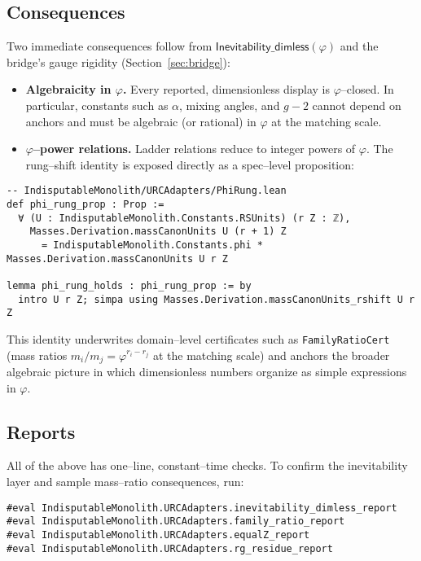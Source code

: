 \documentclass[11pt,a4paper,twoside]{article}
\numberwithin{equation}{section}
\newcommand{\phigr}{\varphi} %
\theoremstyle{customthm}
\theoremstyle{customdef}
\theoremstyle{customrem}
\begin{document}
\subsection{Consequences}

Two immediate consequences follow from $\mathsf{Inevitability\_dimless}(\phigr)$ and the bridge's gauge rigidity (Section~\ref{sec:bridge}):

\begin{itemize}[leftmargin=*]
  \item \textbf{Algebraicity in $\phigr$.} Every reported, dimensionless display is $\phigr$–closed. In particular, constants such as $\alpha$, mixing angles, and $g-2$ cannot depend on anchors and must be algebraic (or rational) in $\phigr$ at the matching scale.
  \item \textbf{$\phigr$–power relations.} Ladder relations reduce to integer powers of $\phigr$. The rung–shift identity is exposed directly as a spec–level proposition:
\end{itemize}

\begin{lstlisting}
-- IndisputableMonolith/URCAdapters/PhiRung.lean
def phi_rung_prop : Prop :=
  ∀ (U : IndisputableMonolith.Constants.RSUnits) (r Z : ℤ),
    Masses.Derivation.massCanonUnits U (r + 1) Z
      = IndisputableMonolith.Constants.phi * Masses.Derivation.massCanonUnits U r Z

lemma phi_rung_holds : phi_rung_prop := by
  intro U r Z; simpa using Masses.Derivation.massCanonUnits_rshift U r Z
\end{lstlisting}

\noindent This identity underwrites domain–level certificates such as \texttt{FamilyRatioCert} (mass ratios $m_i/m_j = \phigr^{r_i-r_j}$ at the matching scale) and anchors the broader algebraic picture in which dimensionless numbers organize as simple expressions in $\phigr$.

\subsection{Reports}

All of the above has one–line, constant–time checks. To confirm the inevitability layer and sample mass–ratio consequences, run:

\begin{lstlisting}
#eval IndisputableMonolith.URCAdapters.inevitability_dimless_report
#eval IndisputableMonolith.URCAdapters.family_ratio_report
#eval IndisputableMonolith.URCAdapters.equalZ_report
#eval IndisputableMonolith.URCAdapters.rg_residue_report
\end{lstlisting}
\end{document}

